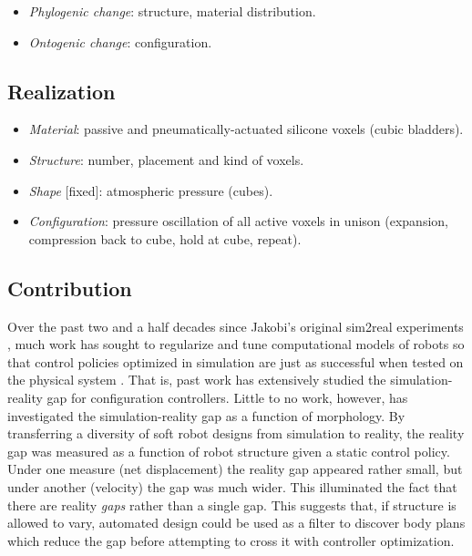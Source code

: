 \begin{itemize}
    \item \textit{Phylogenic change}: structure, material distribution.
    \item \textit{Ontogenic change}: configuration.
\end{itemize}

\subsection{Realization}

\begin{itemize}
    \item \textit{Material}: passive and pneumatically-actuated silicone voxels (cubic bladders).
    \item \textit{Structure}: number, placement and kind of voxels.
    \item \textit{Shape} [fixed]: atmospheric pressure (cubes).
    \item \textit{Configuration}: pressure oscillation of all active voxels in unison (expansion, compression back to cube, hold at cube, repeat).
\end{itemize}



\subsection{Contribution}


Over the past two and a half decades since Jakobi's original sim2real experiments \cite{jakobi1995noise},
much work has sought to regularize and tune computational models of robots
so that control policies optimized in simulation are just as successful when tested on the physical system \cite{bongard2006resilient,hwangbo2019learning}.
That is, past work has extensively studied the simulation-reality gap for configuration controllers.
Little to no work, however, has investigated the simulation-reality gap as a function of morphology.
By transferring a diversity of soft robot designs from simulation to reality, the reality gap was measured as a function of robot structure given a static control policy.
Under one measure (net displacement) the reality gap appeared rather small, but under another (velocity) the gap was much wider.
This illuminated the fact that there are reality \textit{gaps} rather than a single gap.
This suggests that, if structure is allowed to vary, automated design could be used as a filter to discover body plans which reduce the gap before attempting to cross it with controller optimization.

